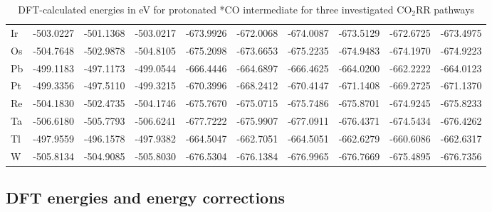 \begin{table}[h]
{\begin{tabular}{*{10}{l}}
      Ir & -503.0227 & -501.1368 & -503.0217 & -673.9926 & -672.0068 & -674.0087 & -673.5129 & -672.6725 & -673.4975 \\
      Os & -504.7648 & -502.9878 & -504.8105 & -675.2098 & -673.6653 & -675.2235 & -674.9483 & -674.1970 & -674.9223 \\
      Pb & -499.1183 & -497.1173 & -499.0544 & -666.4446 & -664.6897 & -666.4625 & -664.0200 & -662.2222 & -664.0123 \\
      Pt & -499.3356 & -497.5110 & -499.3215 & -670.3996 & -668.2412 & -670.4147 & -671.1408 & -669.2725 & -671.1370 \\
      Re & -504.1830 & -502.4735 & -504.1746 & -675.7670 & -675.0715 & -675.7486 & -675.8701 & -674.9245 & -675.8233 \\
      Ta & -506.6180 & -505.7793 & -506.6241 & -677.7222 & -675.9907 & -677.0911 & -676.4371 & -674.5434 & -676.4262 \\
      Tl & -497.9559 & -496.1578 & -497.9382 & -664.5047 & -662.7051 & -664.5051 & -662.6279 & -660.6086 & -662.6317 \\
      W  & -505.8134 & -504.9085 & -505.8030 & -676.5304 & -676.1384 & -676.9965 & -676.7669 & -675.4895 & -676.7356 \\
  \end{tabular}
  }
  \caption{DFT-calculated energies in eV for protonated *CO intermediate for three investigated CO$_2$RR pathways}
  \label{si_table1}
\end{table}


\subsection{DFT energies and energy corrections}


